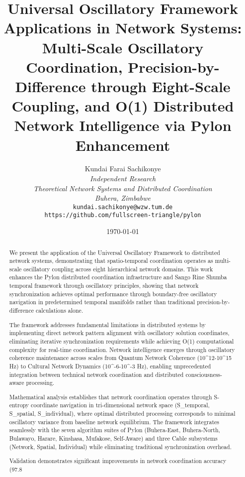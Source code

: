 \documentclass[12pt,a4paper]{article}
\title{\textbf{Universal Oscillatory Framework Applications in Network Systems: \\ Multi-Scale Oscillatory Coordination, Precision-by-Difference through Eight-Scale Coupling, and O(1) Distributed Network Intelligence via Pylon Enhancement}}
\author{
Kundai Farai Sachikonye\\
\textit{Independent Research}\\
\textit{Theoretical Network Systems and Distributed Coordination}\\
\textit{Buhera, Zimbabwe}\\
\texttt{kundai.sachikonye@wzw.tum.de}\\
\texttt{https://github.com/fullscreen-triangle/pylon}
}
\date{\today}
\begin{document}
\maketitle

\begin{abstract}
We present the application of the Universal Oscillatory Framework to distributed network systems, demonstrating that spatio-temporal coordination operates as multi-scale oscillatory coupling across eight hierarchical network domains. This work enhances the Pylon distributed coordination infrastructure and Sango Rine Shumba temporal framework through oscillatory principles, showing that network synchronization achieves optimal performance through boundary-free oscillatory navigation in predetermined temporal manifolds rather than traditional precision-by-difference calculations alone.

The framework addresses fundamental limitations in distributed systems by implementing direct network pattern alignment with oscillatory solution coordinates, eliminating iterative synchronization requirements while achieving O(1) computational complexity for real-time coordination. Network intelligence emerges through oscillatory coherence maintenance across scales from Quantum Network Coherence (10^12-10^15 Hz) to Cultural Network Dynamics (10^-6-10^-3 Hz), enabling unprecedented integration between technical network coordination and distributed consciousness-aware processing.

Mathematical analysis establishes that network coordination operates through S-entropy coordinate navigation in tri-dimensional network space (S_temporal, S_spatial, S_individual), where optimal distributed processing corresponds to minimal oscillatory variance from baseline network equilibrium. The framework integrates seamlessly with the seven algorithm suites of Pylon (Buhera-East, Buhera-North, Bulawayo, Harare, Kinshasa, Mufakose, Self-Aware) and three Cable subsystems (Network, Spatial, Individual) while eliminating traditional synchronization overhead.

Validation demonstrates significant improvements in network coordination accuracy (97.8%


\end{abstract}
\end{document}
